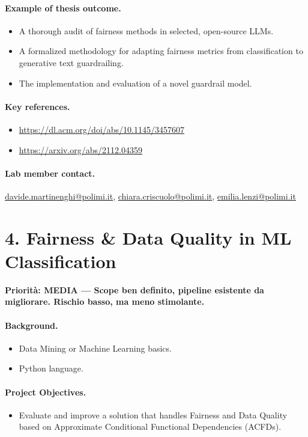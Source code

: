 \documentclass[a4paper,11pt]{article}
\newcommand{\priorita}[1]{%
  \par\smallskip\noindent\textbf{Priorit\`a: #1}\par\smallskip
}
\begin{document}
\paragraph{Example of thesis outcome.}
\begin{itemize}[nosep]
  \item A thorough audit of fairness methods in selected, open-source LLMs.
  \item A formalized methodology for adapting fairness metrics from classification to generative text guardrailing.
  \item The implementation and evaluation of a novel guardrail model.
\end{itemize}

\paragraph{Key references.}
\begin{itemize}[nosep]
  \item \url{https://dl.acm.org/doi/abs/10.1145/3457607}
  \item \url{https://arxiv.org/abs/2112.04359}
\end{itemize}

\paragraph{Lab member contact.}
\url{davide.martinenghi@polimi.it}, \url{chiara.criscuolo@polimi.it}, \url{emilia.lenzi@polimi.it}


\section{4. Fairness \& Data Quality in ML Classification}

\priorita{MEDIA --- Scope ben definito, pipeline esistente da migliorare. Rischio basso, ma meno stimolante.}

\paragraph{Background.}
\begin{itemize}[nosep]
  \item Data Mining or Machine Learning basics.
  \item Python language.
\end{itemize}

\paragraph{Project Objectives.}
\begin{itemize}[nosep]
  \item Evaluate and improve a solution that handles Fairness and Data Quality based on Approximate Conditional Functional Dependencies (ACFDs).
\end{itemize}
\end{document}
